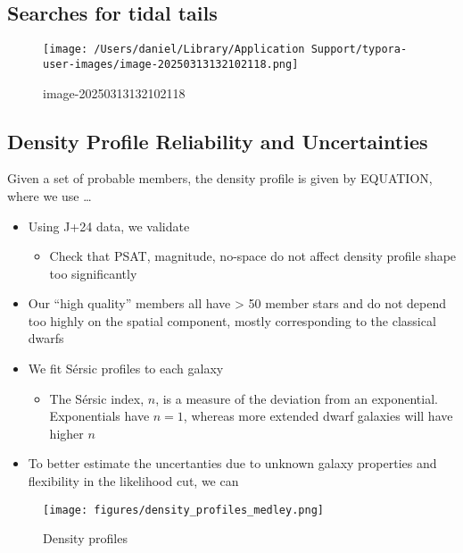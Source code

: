 \subsection{Searches for tidal tails}\label{searches-for-tidal-tails}

\begin{figure}
\centering
\texttt{[image: /Users/daniel/Library/Application Support/typora-user-images/image-20250313132102118.png]}
\caption{image-20250313132102118}
\end{figure}

\subsection{Density Profile Reliability and
Uncertainties}\label{density-profile-reliability-and-uncertainties}

Given a set of probable members, the density profile is given by
EQUATION, where we use \ldots{}

\begin{itemize}
\tightlist
\item
  Using J+24 data, we validate

  \begin{itemize}
  \tightlist
  \item
    Check that PSAT, magnitude, no-space do not affect density profile
    shape too significantly
  \end{itemize}
\item
  Our ``high quality'' members all have \textgreater{} 50 member stars
  and do not depend too highly on the spatial component, mostly
  corresponding to the classical dwarfs
\item
  We fit Sérsic profiles to each galaxy

  \begin{itemize}
  \tightlist
  \item
    The Sérsic index, \(n\), is a measure of the deviation from an
    exponential. Exponentials have \(n=1\), whereas more extended dwarf
    galaxies will have higher \(n\)
  \end{itemize}
\item
  To better estimate the uncertanties due to unknown galaxy properties
  and flexibility in the likelihood cut, we can
\end{itemize}

\begin{figure}
\centering
\texttt{[image: figures/density\_profiles\_medley.png]}
\caption{Density profiles}\label{fig:sculptor_observed_profiles}
\end{figure}

